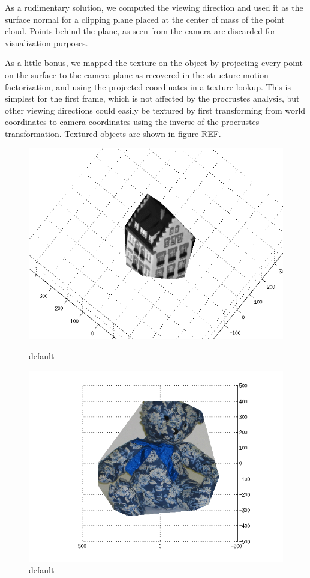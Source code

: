 \documentclass[a4paper,10pt]{article}
\begin{document}
As a rudimentary solution, we computed the viewing direction and used it as the surface normal for a clipping plane placed at the center of mass of the point cloud.
Points behind the plane, as seen from the camera are discarded for visualization purposes.

As a little bonus, we mapped the texture on the object by projecting every point on the surface to the camera plane as recovered in the structure-motion factorization, and using the projected coordinates in a texture lookup.
This is simplest for the first frame, which is not affected by the procrustes analysis, but other viewing directions could easily be textured by first transforming from world coordinates to camera coordinates using the inverse of the procrustes-transformation.
Textured objects are shown in figure REF.

\begin{figure}[ht]
\begin{minipage}[b]{0.45\linewidth}
\centering
\includegraphics[width=\textwidth]{textured_house1}
\caption{default}
\label{fig:figure1}
\end{minipage}
\hspace{0.5cm}
\begin{minipage}[b]{0.45\linewidth}
\centering
\includegraphics[width=\textwidth]{textured_teddy1}
\caption{default}
\label{fig:figure2}
\end{minipage}
\end{figure}
\end{document}
